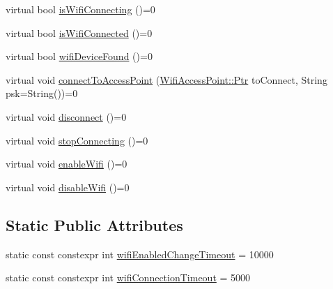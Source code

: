 \begin{DoxyCompactItemize}
\item 
virtual bool \mbox{\hyperlink{classWifiStateManager_1_1NetworkInterface_ade4c478d4b57628d39726f1b85a396f0}{is\+Wifi\+Connecting}} ()=0
\item 
virtual bool \mbox{\hyperlink{classWifiStateManager_1_1NetworkInterface_a236b07174e3ab91973fce616746c0f70}{is\+Wifi\+Connected}} ()=0
\item 
virtual bool \mbox{\hyperlink{classWifiStateManager_1_1NetworkInterface_a0c2675d835715d956315d9e04e2667f9}{wifi\+Device\+Found}} ()=0
\item 
virtual void \mbox{\hyperlink{classWifiStateManager_1_1NetworkInterface_a5c8a6cb7df8aaf53a0ebdf56aefc5080}{connect\+To\+Access\+Point}} (\mbox{\hyperlink{classWifiAccessPoint_ad18977f884076774803027efbaa131a0}{Wifi\+Access\+Point\+::\+Ptr}} to\+Connect, String psk=String())=0
\item 
virtual void \mbox{\hyperlink{classWifiStateManager_1_1NetworkInterface_a440fe19155e268f94cbbd4e133b95037}{disconnect}} ()=0
\item 
virtual void \mbox{\hyperlink{classWifiStateManager_1_1NetworkInterface_a201033fbed61d18311773c3035806fc0}{stop\+Connecting}} ()=0
\item 
virtual void \mbox{\hyperlink{classWifiStateManager_1_1NetworkInterface_a276f17f2d4aa943e9781dcc1b5e93e54}{enable\+Wifi}} ()=0
\item 
virtual void \mbox{\hyperlink{classWifiStateManager_1_1NetworkInterface_ab0dc19a7f15294a59894581a34d6109e}{disable\+Wifi}} ()=0
\end{DoxyCompactItemize}
\subsection*{Static Public Attributes}
\begin{DoxyCompactItemize}
\item 
static const constexpr int \mbox{\hyperlink{classWifiStateManager_1_1NetworkInterface_acb18c91fe47da4e1bd3e9011e46076c9}{wifi\+Enabled\+Change\+Timeout}} = 10000
\item 
static const constexpr int \mbox{\hyperlink{classWifiStateManager_1_1NetworkInterface_a35701ae2339bcbbeeee25518ee990a41}{wifi\+Connection\+Timeout}} = 5000
\end{DoxyCompactItemize}
